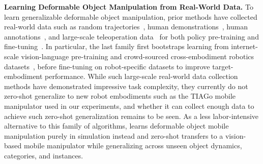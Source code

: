 \textbf{Learning Deformable Object Manipulation from Real-World Data.}
To learn generalizable deformable object manipulation, prior methods have collected real-world data such as random trajectories~\cite{wang2019learning}, human demonstrations~\cite{seita2019deep,seita2021learning,joshi2017robotic}, human annotations~\cite{lui2013tangled}, and large-scale teleoperation data~\cite{lee2015learning} for both policy pre-training and fine-tuning~\cite{black2024pi0,kim2024openvla,team2024octo,zhao2024aloha}. In particular, the last family first bootstraps learning from internet-scale vision-language pre-training and crowd-sourced cross-embodiment robotics datasets~\cite{o2024open}, before fine-tuning on robot-specific datasets to improve target-embodiment performance. While such large-scale real-world data collection methods have demonstrated impressive task complexity, they currently do not zero-shot generalize to new robot embodiments such as the TIAGo mobile manipulator used in our experiments, and whether it can collect enough data to achieve such zero-shot generalization remains to be seen. As a less labor-intensive alternative to this family of algorithms, \methodname{} learns deformable object mobile manipulation purely in simulation instead and zero-shot transfers to a vision-based mobile manipulator while generalizing across unseen object dynamics, categories, and instances.

